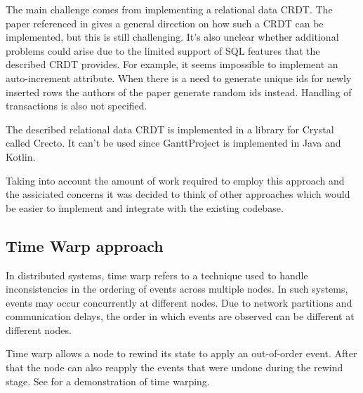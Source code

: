 \documentclass[a4paper, 11pt, oneside]{article}
\theoremstyle{definition}
\begin{document}
The main challenge comes from implementing a relational data CRDT. The paper referenced in  gives a general direction on how such a CRDT can be implemented, but this is still challenging. It's also unclear whether additional problems could arise due to the limited support of SQL features that the described CRDT provides. For example, it seems impossible to implement an auto-increment attribute. When there is a need to generate unique ids for newly inserted rows the authors of the paper generate random ids instead. Handling of transactions is also not specified.

The described relational data CRDT is implemented in a library for Crystal called Crecto. It can't be used since GanttProject is implemented in Java and Kotlin. 

Taking into account the amount of work required to employ this approach and the assiciated concerns it was decided to think of other approaches which would be easier to implement and integrate with the existing codebase.


\subsection{Time Warp approach}\label{sec:timewarp}

In distributed systems, time warp \cite{timewarp1} refers to a technique used to handle inconsistencies in the ordering of events across multiple nodes. In such systems, events may occur concurrently at different nodes. Due to network partitions and communication delays, the order in which events are observed can be different at different nodes.

Time warp allows a node to rewind its state to apply an out-of-order event. After that the node can also reapply the events that were undone during the rewind stage. See  for a demonstration of time warping.
\end{document}
